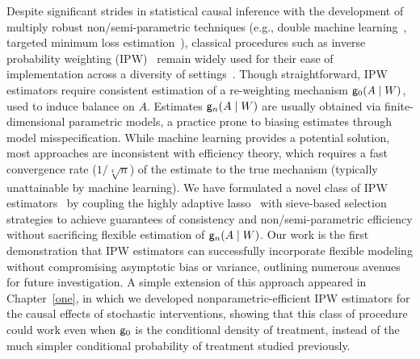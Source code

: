 Despite significant strides in statistical causal inference with the development
of multiply robust non/semi-parametric techniques (e.g., double machine
learning~\citep{chernozhukov2017double, chernozhukov2018double}, targeted
minimum loss estimation~\citep{vdl2006targeted, vdl2011targeted,
vdl2018targeted}), classical procedures such as inverse probability weighting
(IPW)~\citep{horvitz1952generalization, rosenbaum1983central, hernan2021causal}
remain widely used for their ease of implementation across a diversity of
settings~\citep{hernan2021causal}. Though straightforward, IPW estimators
require consistent estimation of a re-weighting mechanism $\mathsf{g}_0(A \mid W)$,
used to induce balance on $A$. Estimates $\mathsf{g}_n(A \mid W)$ are usually obtained
via finite-dimensional parametric models, a practice prone to biasing estimates
through model misspecification. While machine learning provides a potential
solution, most approaches are inconsistent with efficiency theory, which
requires a fast convergence rate ($1/\sqrt[4]{n}$) of the estimate to the true
mechanism (typically unattainable by machine learning). We have formulated
a novel class of IPW estimators~\citep{ertefaie2020nonparametric} by coupling
the highly adaptive lasso~\citep{benkeser2016highly, vdl2017generally,
bibaut2019fast, hejazi2020hal9001} with sieve-based selection strategies to
achieve guarantees of consistency and non/semi-parametric efficiency without
sacrificing flexible estimation of $\mathsf{g}_n(A \mid W)$. Our work is the first
demonstration that IPW estimators can successfully incorporate flexible modeling
without compromising asymptotic bias or variance, outlining numerous avenues for
future investigation. A simple extension of this approach appeared in
Chapter~\ref{one}, in which we developed nonparametric-efficient IPW estimators
for the causal effects of stochastic interventions, showing that this class of
procedure could work even when $\mathsf{g}_0$ is the conditional density of treatment,
instead of the much simpler conditional probability of treatment studied
previously.

